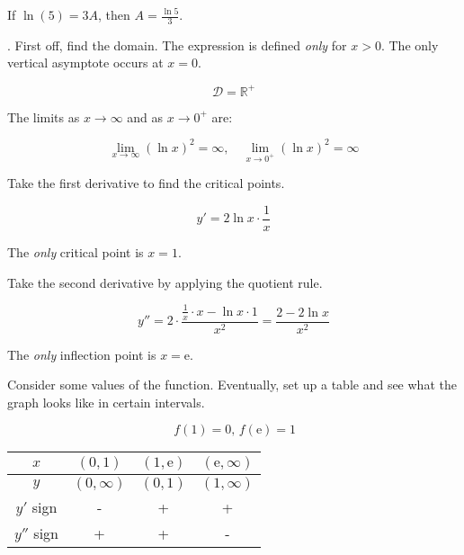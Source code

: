 \documentclass{article}
\begin{document}
\hfill

\noindent If $\ln(5) = 3A$, then $\boxed{A =\frac{\ln5}3}$.

\hfill

. First off, find the domain. The expression is defined \textit{only} for $x>0$. The only vertical asymptote occurs at $x=0$.

\[\mathcal{D} = \mathbb{R}^+\]

\hfill

\noindent The limits as $x\to\infty$ and as $x\to0^+$ are:

\[\lim_{x\to \infty}(\ln x)^2=\infty,\quad \lim_{x\to0^+}(\ln x)^2=\infty \]

\hfill

\noindent Take the first derivative to find the critical points.

\[y'=2\ln x\cdot\frac1x\]

\hfill

\noindent The \textit{only} critical point is $x=1$.

\hfill

\noindent Take the second derivative by applying the quotient rule.

\[y''=2\cdot\frac{\frac1x \cdot x-\ln x \cdot 1}{x^2}=\frac{2-2\ln x}{x^2}\]

\hfill

\noindent The \textit{only} inflection point is $x=\mathrm{e}$.

\hfill

\noindent Consider some values of the function. Eventually, set up a table and see what the graph looks like in certain intervals.

\[\,f\left(1\right)=0,\,f(\mathrm{e})=1\]

\begin{center}
    \large
    \begin{tabular}{ |c| c c c| } 
    \hline
        $x$ & $\left(0, 1\right)$ & $\left(1, \mathrm{e}\right)$&$\left(\mathrm{e}, \infty\right)$  \\
        \hline
        $y$ & $(0, \infty)$ &$(0,1)$ & $(1, \infty)$ \\
        \hline
        $y'$ sign & - & + & + \\
        \hline
        $y''$ sign & + & + & - \\
        \hline
    \end{tabular}
\end{center}

\hfill
\end{document}
